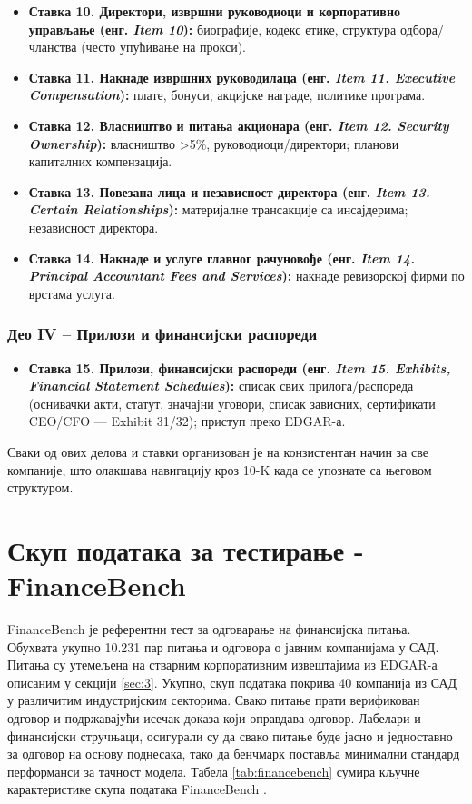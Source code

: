 \begin{itemize}
\item \textbf{Ставка 10. Директори, извршни руководиоци и корпоративно управљање (енг. \textit{Item 10}):} биографије, кодекс етике, структура одбора/чланства (често упућивање на прокси).

\item \textbf{Ставка 11. Накнаде извршних руководилаца (енг. \textit{Item 11. Executive Compensation}):} плате, бонуси, акцијске награде, политике програма.

\item \textbf{Ставка 12. Власништво и питања акционара (енг. \textit{Item 12. Security Ownership}):} власништво >5\%, руководиоци/директори; планови капиталних компензација.

\item \textbf{Ставка 13. Повезана лица и независност директора (енг. \textit{Item 13. Certain Relationships}):} материјалне трансакције са инсајдерима; независност директора.

\item \textbf{Ставка 14. Накнаде и услуге главног рачуновође (енг. \textit{Item 14. Principal Accountant Fees and Services}):} накнаде ревизорској фирми по врстама услуга.
\end{itemize}

\subsubsection{Део IV – Прилози и финансијски распореди}

\begin{itemize}
\item \textbf{Ставка 15. Прилози, финансијски распореди (енг. \textit{Item 15. Exhibits, Financial Statement Schedules}):} списак свих прилога/распореда (оснивачки акти, статут, значајни уговори, списак зависних, сертификати CEO/CFO — Exhibit 31/32); приступ преко EDGAR-а.
\end{itemize}

Сваки од ових делова и ставки организован је на конзистентан начин за све компаније, што олакшава навигацију кроз 10-K када се упознате са његовом структуром.

\section{Скуп података за тестирање - FinanceBench}

FinanceBench је референтни тест за одговарање на финансијска питања. Обухвата укупно 10.231 пар питања и одговора о јавним компанијама у САД. Питања су утемељена на стварним корпоративним извештајима из EDGAR-а описаним у секцији \ref{sec:3}. Укупно, скуп података покрива 40 компанија из САД у различитим индустријским секторима. Свако питање прати верификован одговор и подржавајући исечак доказа који оправдава одговор. Лабелари и финансијски стручњаци, осигурали су да свако питање буде јасно и једноставно за одговор на основу поднесака, тако да бенчмарк поставља минимални стандард перформанси за тачност модела. Табела \ref{tab:financebench} сумира кључне карактеристике скупа података FinanceBench \cite{islam_financebench_2023}.

